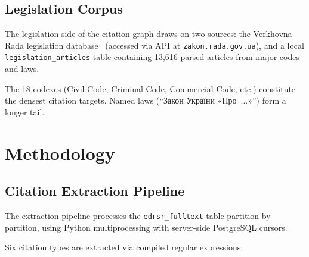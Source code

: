 \documentclass[11pt]{article}
\begin{document}
\subsection{Legislation Corpus}

The legislation side of the citation graph draws on two sources: the Verkhovna Rada legislation database~\citep{zakonrada} (accessed via API at \texttt{zakon.rada.gov.ua}), and a local \texttt{legislation\_articles} table containing 13{,}616 parsed articles from major codes and laws.

The 18 codexes (Civil Code, Criminal Code, Commercial Code, etc.) constitute the densest citation targets.
Named laws (``\foreignlanguage{ukrainian}{Закон \foreignlanguage{ukrainian}{України} «Про~...»}'') form a longer tail.


\section{Methodology}
\label{sec:method}

\subsection{Citation Extraction Pipeline}
\label{sec:extraction}

The extraction pipeline processes the \texttt{edrsr\_fulltext} table partition by partition, using Python multiprocessing with server-side PostgreSQL cursors.

Six citation types are extracted via compiled regular expressions:
\end{document}
